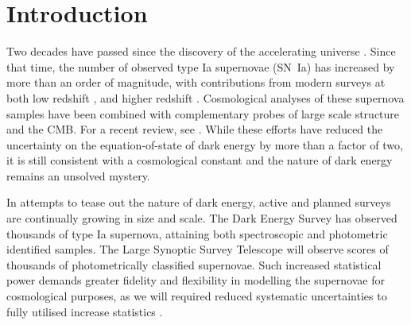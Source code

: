 \documentclass[a4paper,fleqn,usenatbib]{mnras}
\newcommand{\green}{\color{forestgreen}}
\begin{document}

\section{Introduction}




Two decades have passed since the discovery of the accelerating universe \citep{Riess1998, Perlmutter1999}. Since that time, the number of observed type Ia supernovae (SN~Ia) has increased by more than an order of magnitude, with contributions from modern surveys at both low redshift \citep{Bailey2008, Freedman2009, Hicken2009,  Contreras2010, Conley2011}, and higher redshift \citep{Astier2006, Wood-Vasey2007, Frieman2008, Balland2009, Amanullah2010, chambers2016panstarrs, sako2018sdss}. Cosmological analyses of these supernova samples \citep{Kowalski2008, Kessler2009, Conley2011, Suzuki2012, Betoule2014, Rest2014, Scolnic2017} have been combined with complementary probes of large scale structure and the CMB. For a recent review, see \citet{Huterer2018}. {\green While these efforts have reduced the uncertainty on the equation-of-state of dark energy by more than a factor of two, it is still consistent with a cosmological constant and the nature of dark energy remains an unsolved mystery.}


In attempts to tease out the nature of dark energy, active and planned surveys are {\green continually growing in size and scale}. The Dark Energy Survey \citep[DES,][]{Bernstein2012, Abbott2016} has observed thousands of type Ia supernova, attaining both spectroscopic and photometric identified samples. The Large Synoptic Survey Telescope \citep[LSST,][]{Ivezic2008, LSSTScienceCollaboration2009} will observe scores of thousands of photometrically classified supernovae. {\green Such increased statistical power demands greater fidelity and flexibility in modelling the supernovae for cosmological purposes, as we will required reduced systematic uncertainties to fully utilised increase statistics} \citep{Betoule2014, Scolnic2017}.
\end{document}
